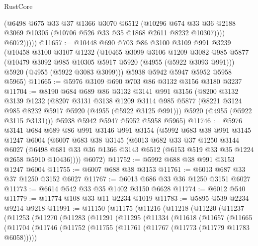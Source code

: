 \begin{lexlean}{RustCore}
\begin{coremodule}
                (@6498
                  @675
                  @33
                  @37
                  @1366
                  @3070
                  @6512
                  (@10296
                    @674
                    @33
                    @36
                    @2188
                    @3069
                    @10305
                    (@10706 @526 @33 @35 @1868 @2611 @8232 @10307))))
              @6072)))))
@11657 := @10448
    @690
    @703
    @86
    @3100
    @3109
    @991
    @3239
    (@10458
      @3100
      @3107
      @1232
      (@10465
        @3099
        @3106
        @1209
        @3082
        @985
        @5877
        (@10479 @3092 @985 @10305 @5917 @5920 (@4955 (@5922 @3093 @991)))
        @5920
        (@4955 (@5922 @3083 @3099)))
      @5938
      @5942
      @5947
      @5952
      @5958
      @5965)
@11665 := @5976 @3109 @690 @703 @86 @3132 @3156 @3180 @3237
@11704 := @8190
    @684
    @689
    @86
    @3132
    @3141
    @991
    @3156
    (@8200
      @3132
      @3139
      @1232
      (@8207
        @3131
        @3138
        @1209
        @3114
        @985
        @5877
        (@8221 @3124 @985 @8232 @5917 @5920 (@4955 (@5922 @3125 @991)))
        @5920
        (@4955 (@5922 @3115 @3131)))
      @5938
      @5942
      @5947
      @5952
      @5958
      @5965)
@11746 := @5976
    @3141
    @684
    @689
    @86
    @991
    @3146
    @991
    @3154
    (@5992
      @683
      @38
      @991
      @3145
      @1247
      @6004
      (@6007
        @683
        @38
        @3145
        (@6013
          @682
          @33
          @37
          @1250
          @3144
          @6027
          (@6498 @681 @33 @36 @1366 @3143 @6512 (@6153 @519 @33 @35 @1224 @2658 @5910 @10436))))
      @6072)
@11752 := @5992 @688 @38 @991 @3153 @1247 @6004
@11755 := @6007 @688 @38 @3153
@11761 := @6013 @687 @33 @37 @1250 @3152 @6027
@11767 := @6013 @686 @33 @36 @1250 @3151 @6027
@11773 := @6614 @542 @33 @35 @1402 @3150 @6628
@11774 := @6012 @540
@11779 := @11774 @108 @33 @11 @2234 @1019
@11783 := @5895 @539 @2234 @9214 @9218
@11991 := @11150
    (@11175
      (@11216
        (@11218
          (@11220
            (@11237
              (@11253
                (@11270
                  (@11283
                    (@11291
                      (@11295
                        (@11334
                          (@11618
                            (@11657
                              (@11665
                                (@11704
                                  (@11746
                                    (@11752
                                      (@11755 (@11761 (@11767 (@11773 (@11779 @11783 @6058)))))

\end{coremodule}
\end{lexlean}
